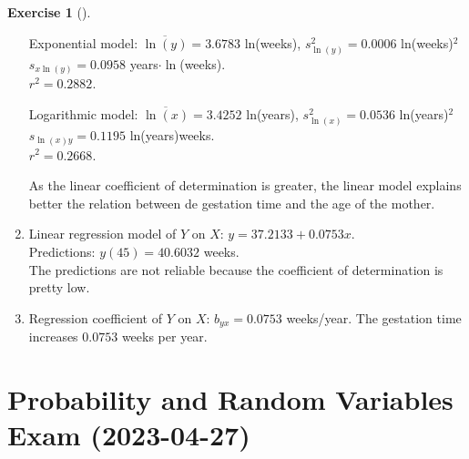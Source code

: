 \documentclass[
  a4paper,
]{scrreport}
\theoremstyle{definition}
\newtheorem{exercise}{Exercise}[chapter]
\theoremstyle{remark}
\begin{document}
\begin{exercise}[]
\begin{tcolorbox}
\begin{enumerate}
  Exponential model: \(\overline{\ln(y)} = 3.6783\) ln(weeks),
  \(s_{\ln(y)}^2 = 0.0006\) ln(weeks)\(^2\)\\
  \(s_{x\ln(y)} = 0.0958\) years\(\cdot\ln\)(weeks).\\
  \(r^2 = 0.2882\).

  Logarithmic model: \(\overline{\ln(x)} = 3.4252\) ln(years),
  \(s_{\ln(x)}^2 = 0.0536\) ln(years)\(^2\)\\
  \(s_{\ln(x)y} = 0.1195\) ln(years)weeks.\\
  \(r^2 = 0.2668\).

  As the linear coefficient of determination is greater, the linear
  model explains better the relation between de gestation time and the
  age of the mother.
\item
  Linear regression model of \(Y\) on \(X\):
  \(y = 37.2133 + 0.0753 x\).\\
  Predictions: \(y(45) = 40.6032\) weeks.\\
  The predictions are not reliable because the coefficient of
  determination is pretty low.
\item
  Regression coefficient of \(Y\) on \(X\): \(b_{yx} = 0.0753\)
  weeks/year. The gestation time increases \(0.0753\) weeks per year.
\end{enumerate}

\end{tcolorbox}

\end{exercise}


\hypertarget{probability-and-random-variables-exam-2023-04-27}{%
\chapter{Probability and Random Variables Exam
(2023-04-27)}\label{probability-and-random-variables-exam-2023-04-27}}
\end{document}
